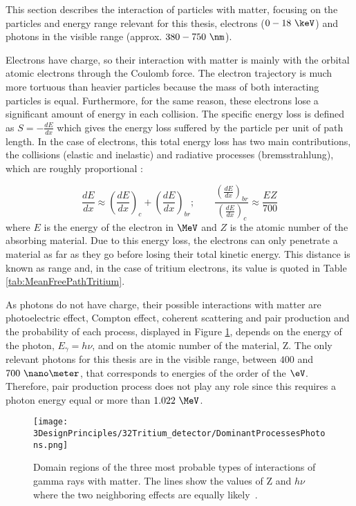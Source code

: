 This section describes the interaction of particles with matter, focusing on the particles and energy range relevant for this thesis, electrons ($0-18~\keV$) and photons in the visible range (approx. $380-750~\nm$).

Electrons have charge, so their interaction with matter is mainly with the orbital atomic  electrons through the Coulomb force. The electron trajectory is much more tortuous than heavier particles because the mass of both interacting particles is equal. Furthermore, for the same reason, these electrons lose a significant amount of energy in each collision. The specific energy loss is defined as $S=-\displaystyle{\frac{dE}{dx}}$ which gives the energy loss suffered by the particle per unit of path length. In the case of electrons, this total energy loss has two main contributions, the collisions (elastic and inelastic) and radiative processes (bremsstrahlung), which are roughly proportional \cite{Knoll, Leo}:

\begin{equation}
\frac{dE}{dx} \approx \left(\frac{dE}{dx}\right)_{c} + \left(\frac{dE}{dx}\right)_{br} ; \qquad \frac{\displaystyle{\left(\frac{dE}{dx}\right)_{br}}}{\displaystyle{\left(\frac{dE}{dx}\right)_{c}}} \approx \frac{EZ}{700}
\label{eq:ElectronInteraction}
\end{equation}
where $E$ is the energy of the electron in $\MeV$ and $Z$ is the atomic number of the absorbing material. Due to this energy loss, the electrons can only penetrate a material as far as they go before losing their total kinetic energy. This distance is known as range and, in the case of tritium electrons, its value is quoted in Table \ref{tab:MeanFreePathTritium}.

As photons do not have charge, their possible interactions with matter are photoelectric effect, Compton effect, coherent scattering and pair production and the probability of each process, displayed in Figure \ref{fig:ProcessesPhotons}, depends on the energy of the photon, $E_\gamma = h\nu$, and on the atomic number of the material, Z. The only relevant photons for this thesis are in the visible range, between $400$ and $700~\nano\meter$, that corresponds to energies of the order of the $\eV$. Therefore, pair production process does not play any role since this requires a photon energy equal or more than $1.022~\MeV$.

\begin{figure}[h]
\centering
\texttt{[image: 3DesignPrinciples/32Tritium\_detector/DominantProcessesPhotons.png]}
\caption{Domain regions of the three most probable types of interactions of gamma rays with matter. The lines show the values of Z and $h\nu$ where the two neighboring effects are equally likely\label{fig:ProcessesPhotons}~\cite{Knoll, Leo}.}
\end{figure}

